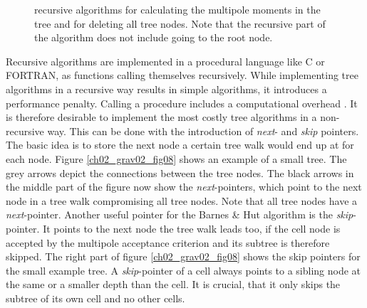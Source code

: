 \begin{figure}[htbp]
\begin{center}
\caption{recursive algorithms for calculating the multipole moments in the tree and for deleting all tree nodes. Note that the recursive part of the algorithm does not include going to the root node.}
\label{ch02_fig14}
\end{center}
\end{figure}

Recursive algorithms are implemented in a procedural language like C or FORTRAN, as functions calling themselves recursively. While implementing tree algorithms in a recursive way results in simple algorithms, it introduces a performance penalty. Calling a procedure includes a computational overhead \citep{bryant2010computer}. It is therefore desirable to implement the most costly tree algorithms in a non-recursive way. This can be done with the introduction of \emph{next}- and \emph{skip} pointers. The basic idea is to store the next node a certain tree walk would end up at for each node. Figure \ref{ch02_grav02_fig08} shows an example of a small tree. The grey arrows depict the connections between the tree nodes. The black arrows in the middle part of the figure now show the \emph{next}-pointers, which point to the next node in a tree walk compromising all tree nodes. Note that all tree nodes have a \emph{next}-pointer. Another useful pointer for the Barnes \& Hut algorithm is the \emph{skip}-pointer. It points to the next node the tree walk leads too, if the cell node is accepted by the multipole acceptance criterion and its subtree is therefore skipped. The right part of figure \ref{ch02_grav02_fig08} shows the skip pointers for the small example tree. A \emph{skip}-pointer of a cell always points to a sibling node at the same or a smaller depth than the cell. It is crucial, that it only skips the subtree of its own cell and no other cells. 

